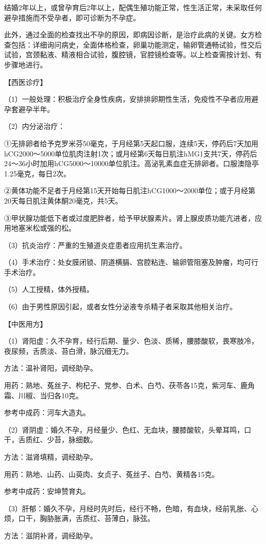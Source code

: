 \documentclass[12pt,UTF8]{ctexbook}
\begin{document}
结婚2年以上，或曾孕育后2年以上，配偶生殖功能正常，性生活正常，未采取任何避孕措施而不受孕者，即可诊断为不孕症。

此外，通过全面的检查找出不孕的原因，即病因诊断，是治疗此病的关键。女方检查包括：详细询问病史，全面体格检查，卵巢功能测定，输卵管通畅试验，性交后试验，宫颈黏液、精液相合试验，腹腔镜，官腔镜检查等。以上检查需按计划、有步骤地进行。

【西医诊疗】

（1）一般处理：积极治疗全身性疾病，安排排卵期性生活，免疫性不孕者应用避孕套避孕半年。

（2）内分泌治疗：

①无排卵者给予克罗米芬50毫克，于月经第5天起口服，连续5天，停药后7天加用hCG2000～5000单位肌肉注射1次；或月经第6天每日肌注hMG1支共7天，停药后24～36小时加用hCG5000～10000单位肌注。高泌乳素血症无排卵者。口服澳隐亭1.25毫克，每日2次。

②黄体功能不足者于月经第15天开始每日肌注hCG1000～2000单位；或于月经第20天每日肌注黄体酮20毫克，共5天。

③甲状腺功能低下者或过度肥胖者，给予甲状腺素片。肾上腺皮质功能亢进者，应用地塞米松或强的松。

（3）抗炎治疗：严重的生殖道炎症患者应用抗生素治疗。

（4）手术治疗：处女膜闭锁、阴道横膈、宫腔粘连、输卵管阻塞及肿瘤，均可行手术治疗。

（5）人工授精，体外授精。

（6）由于男性原因引起，或者女性分泌液专杀精子者采取其他相关治疗。

【中医用方】

（1）肾阳虚：久不孕育，经行后期、量少、色淡、质稀，腰膝酸软，畏寒肢冷，夜尿频，舌质淡、苔白滑，脉沉细无力。

方法：温补肾阳，调经助孕。

用药：熟地、菟丝子、枸杞子、党参、白术、白芍、茯苓各15克，紫河车、鹿角霜、川椒、当归各10克。

参考中成药：河车大造丸。

（2）肾阴虚：婚久不孕，月经量少、色红、无血块，腰膝酸软，头晕耳鸣，口干，舌质红、少苔，脉细数。

方法：滋肾填精，调经助孕。

用药：熟地、山药、山萸肉、女贞子、菟丝子、白芍、黄精各15克。

参考中成药：安坤赞育丸。

（3）肝郁：婚久不孕，月经时先时后，经行不畅，色暗，有血块，经前乳胀、心烦，口干，胸胁胀满，舌质红、苔薄白，脉弦。

方法：滋阴补肾，调经助孕。
\end{document}
